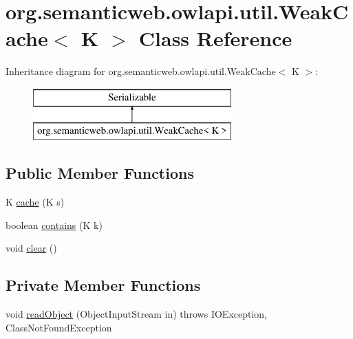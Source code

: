 \hypertarget{classorg_1_1semanticweb_1_1owlapi_1_1util_1_1_weak_cache_3_01_k_01_4}{\section{org.\-semanticweb.\-owlapi.\-util.\-Weak\-Cache$<$ K $>$ Class Reference}
\label{classorg_1_1semanticweb_1_1owlapi_1_1util_1_1_weak_cache_3_01_k_01_4}
}
Inheritance diagram for org.\-semanticweb.\-owlapi.\-util.\-Weak\-Cache$<$ K $>$\-:\begin{figure}[H]
\begin{center}
\leavevmode
\includegraphics[height=2.000000cm]{classorg_1_1semanticweb_1_1owlapi_1_1util_1_1_weak_cache_3_01_k_01_4}
\end{center}
\end{figure}
\subsection*{Public Member Functions}
\begin{DoxyCompactItemize}
\item 
K \hyperlink{classorg_1_1semanticweb_1_1owlapi_1_1util_1_1_weak_cache_3_01_k_01_4_aab931e1bacfd9354b3c576fe6ab3241f}{cache} (K s)
\item 
boolean \hyperlink{classorg_1_1semanticweb_1_1owlapi_1_1util_1_1_weak_cache_3_01_k_01_4_a96f5da26c8af6da76cec92b3ed652b2e}{contains} (K k)
\item 
void \hyperlink{classorg_1_1semanticweb_1_1owlapi_1_1util_1_1_weak_cache_3_01_k_01_4_a73b526632dea1fe28e1b32e92ed00927}{clear} ()
\end{DoxyCompactItemize}
\subsection*{Private Member Functions}
\begin{DoxyCompactItemize}
\item 
void \hyperlink{classorg_1_1semanticweb_1_1owlapi_1_1util_1_1_weak_cache_3_01_k_01_4_a9787302913f17cc6eadd2c41010377df}{read\-Object} (Object\-Input\-Stream in)  throws I\-O\-Exception,     Class\-Not\-Found\-Exception 
\end{DoxyCompactItemize}
